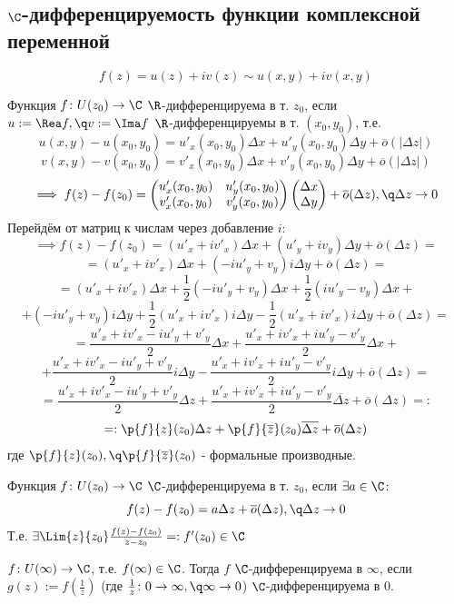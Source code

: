 \subsection{$\C$-дифференцируемость функции комплексной переменной}
\[f(z)=u(z)+iv(z)\sim u(x,y)+iv(x,y)\]
\begin{definition}
  Функция $f\colon U(z_0)\to\C$ $\R$-дифференцируема в т. $z_0$, если $u :=\Rea f,\q v:=\Ima f$ $\R$-дифференцируемы в т. $(x_0,y_0)$, т.е.
  \[u(x,y) - u(x_0,y_0) = u'_x(x_0,y_0)\Delta x + u'_y(x_0,y_0)\Delta y + \overline{o}(|\Delta z|)\]
  \[v(x,y) - v(x_0,y_0) = v'_x(x_0,y_0)\Delta x + v'_y(x_0,y_0)\Delta y + \overline{o}(|\Delta z|)\]
  \[\implies f(z) - f(z_0) = \begin{pmatrix}u'_x(x_0,y_0)&u'_y(x_0,y_0)\\v'_x(x_0,y_0)&v'_y(x_0,y_0)\end{pmatrix}\begin{pmatrix}\Delta x\\\Delta y\end{pmatrix} + \overline{o}(\Delta z),\q \Delta z\to 0\]
    Перейдём от матриц к числам через добавление $i$:
    \[\implies f(z) - f(z_0)= (u'_x+iv'_x)\Delta x + (u'_y + iv_y)\Delta y + \overline{o}(\Delta z)=\]
    \[=(u'_x+iv'_x)\Delta x + (-iu'_y + v_y)i\Delta y + \overline{o}(\Delta z)=\]
    \[=(u'_x+iv'_x)\Delta x + \frac{1}{2}(-iu'_y + v_y)\Delta x + \frac{1}{2}(iu'_y - v_y)\Delta x + \]\[+(-iu'_y + v_y)i\Delta y + \frac{1}{2}(u'_x+iv'_x)i\Delta y - \frac{1}{2}(u'_x+iv'_x)i\Delta y+\overline{o}(\Delta z)=\]
    \[=\frac{u'_x+iv'_x - iu'_y + v'_y}{2}\Delta x + \frac{u'_x+iv'_x + iu'_y - v'_y}{2}\Delta x+\]
    \[+\frac{u'_x+iv'_x - iu'_y + v'_y}{2}i\Delta y - \frac{u'_x+iv'_x + iu'_y - v'_y}{2}i\Delta y + \overline{o}(\Delta z)=\]
    \[=\frac{u'_x+iv'_x - iu'_y + v'_y}{2}\Delta z + \frac{u'_x+iv'_x + iu'_y - v'_y}{2}\overline{\Delta z} + \overline{o}(\Delta z)=:\]
    \[=:\p{f}{z}(z_0)\Delta z+\p{f}{\overline{z}}(z_0)\overline{\Delta z} + \overline{o}(\Delta z)\]
    где $\p{f}{z}(z_0),\q \p{f}{\overline{z}}(z_0)$ - формальные производные. 
\end{definition}
\begin{definition}
  Функция $f\colon U(z_0)\to\C$ $\C$-дифференцируема в т. $z_0$, если $\exists a\in\C\colon$
  \[f(z) - f(z_0) = a\Delta z + \overline{o}(\Delta z),\q\Delta z\to 0\]
  Т.е. $\exists \Lim{z}{z_0}\frac{f(z)-f(z_0)}{z-z_0}=:f'(z_0)\in\C$
\end{definition}
\begin{definition}
  $f\colon U(\infty)\to \C$, т.е. $f(\infty)\in\C$. Тогда $f$ $\C$-дифференцируема в $\infty$, если $g(z):=f(\frac{1}{z})$ (где $\frac{1}{z}\colon 0\to \infty,\q \infty\to 0$) $\C$-дифференцируема в 0.  
\end{definition}
